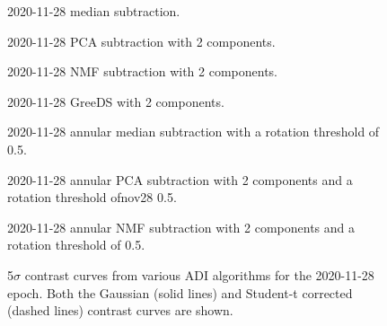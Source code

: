 \begin{figure}[h!]
    \centering
    \caption{2020-11-28 median subtraction.}
\end{figure}

\begin{figure}[h!]
    \centering
    \caption{2020-11-28 PCA subtraction with 2 components.}
\end{figure}

\begin{figure}[h!]
    \centering
    \caption{2020-11-28 NMF subtraction with 2 components.}
\end{figure}

\begin{figure}[h!]
    \centering
    \caption{2020-11-28 GreeDS with 2 components.}
\end{figure}

\begin{figure}[h!]
    \centering
    \caption{2020-11-28 annular median subtraction with a rotation threshold of 0.5.}
\end{figure}

\begin{figure}[h!]
    \centering
    \caption{2020-11-28 annular PCA subtraction with 2 components and a rotation threshold ofnov28 0.5.}
\end{figure}

\begin{figure}[h!]
    \centering
    \caption{2020-11-28 annular NMF subtraction with 2 components and a rotation threshold of 0.5.}
\end{figure}

\begin{figure}[h!]
    \centering
    \caption{5$\sigma$ contrast curves from various ADI algorithms for the 2020-11-28 epoch. Both the Gaussian (solid lines) and Student-t corrected (dashed lines) contrast curves are shown.}
\end{figure}
